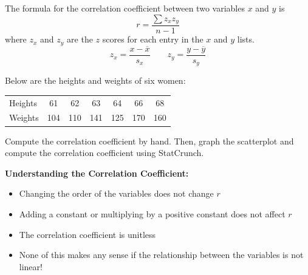 \documentclass[../mathNotesPreamble]{subfiles}
\providecommand{\subfiles}{.}
\begin{document}
  \begin{defn*}
    The formula for the correlation coefficient between two variables $x$ and $y$ is
      \[r=\dfrac{\sum z_xz_y}{n-1}\]
    where $z_x$ and $z_y$ are the $z$ scores for each entry in the $x$ and $y$ lists.
      \[z_x=\dfrac{x-\overline{x}}{s_x} \qquad z_y=\dfrac{y-\overline{y}}{s_y}\]
  \end{defn*}
  \begin{ex*}
    Below are the heights and weights of six women:
    \begin{center}
      \begin{tabular}{@{}l*{6}{c}@{}}\toprule
        Heights& 61& 62& 63& 64& 66& 68\\
        Weights& 104& 110& 141& 125& 170& 160\\\bottomrule
      \end{tabular}
    \end{center}
    Compute the correlation coefficient by hand. Then, graph the scatterplot and compute the correlation coefficient using StatCrunch.
  \end{ex*}
  \begin{flushright}
  \end{flushright}
  \pagebreak

  \noindent\textbf{Understanding the Correlation Coefficient:}
  \begin{itemize}
    \item Changing the order of the variables does not change $r$
    \item Adding a constant or multiplying by a positive constant does not affect $r$
    \item The correlation coefficient is unitless
    \item None of this makes any sense if the relationship between the variables is not linear!
  \end{itemize}

  \pagebreak
\end{document}
